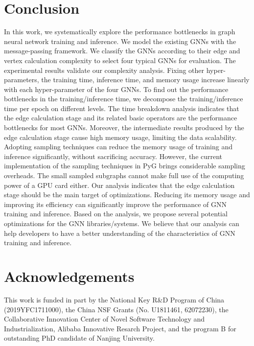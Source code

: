 \section{Conclusion}
\label{sec:conclusion}

In this work, we systematically explore the performance bottlenecks in graph neural network training and inference.
%
We model the existing GNNs with the message-passing framework. 
%
We classify the GNNs according to their edge and vertex calculation complexity to select four typical GNNs for evaluation. 
%
The experimental results validate our complexity analysis.
%
Fixing other hyper-parameters, the training time, inference time, and memory usage increase linearly with each hyper-parameter of the four GNNs.
%
To find out the performance bottlenecks in the training/inference time, we decompose the training/inference time per epoch on different levels.
%
The time breakdown analysis indicates that the edge calculation stage and its related basic operators are the performance bottlenecks for most GNNs.
%
Moreover, the intermediate results produced by the edge calculation stage cause high memory usage, limiting the data scalability.
%
Adopting sampling techniques can reduce the memory usage of training and inference significantly, without sacrificing accuracy. 
%
However, the current implementation of the sampling techniques in PyG brings considerable sampling overheads.
%
The small sampled subgraphs cannot make full use of the computing power of a GPU card either.
% 
Our analysis indicates that the edge calculation stage should be the main target of optimizations.
%
Reducing its memory usage and improving its efficiency can significantly improve the performance of GNN training and inference.
%
Based on the analysis, we propose several potential optimizations for the GNN libraries/systems.
%
We believe that our analysis can help developers to have a better understanding of the characteristics of GNN training and inference.

\section*{Acknowledgements}

This work is funded in part by the National Key R\&D Program of China (2019YFC1711000), the China NSF Grants (No. U1811461, 62072230), the Collaborative Innovation Center of Novel Software Technology and Industrialization, Alibaba Innovative Resarch Project, and the program B for outstanding PhD candidate of Nanjing University.

